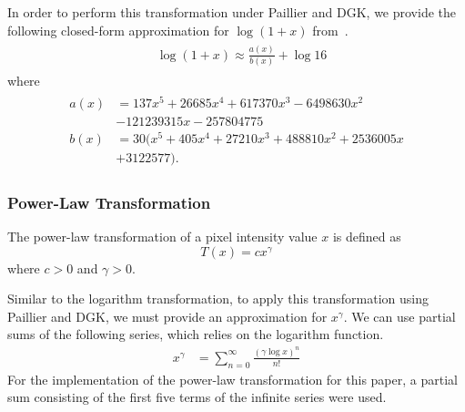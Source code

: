 In order to perform this transformation under Paillier and DGK, we provide the following closed-form approximation for $\log\left(1 + x\right)$ from~\cite{pcsc-paper}.
\begin{align}\label{eq:optimal_log_approximation}
	\begin{split}
		&\log\left(1+x\right) \approx \frac{a(x)}{b(x)} + \log{16}
	\end{split}
\end{align}
where
\begin{align*}
	\begin{split}
	a(x) &= 137x^5 + 26685x^4 + 617370x^3 - 6498630x^2 \\
	&- 121239315x - 257804775\\
	b(x) &= 30(x^5 + 405x^4 + 27210x^3 + 488810x^2 + 2536005x \\
	&+ 3122577).
	\end{split}
\end{align*}

\subsubsection{Power-Law Transformation}
The power-law transformation of a pixel intensity value $x$ is defined as
\begin{equation}
    T\left(x\right) = cx^{\gamma}
\end{equation}
where $c>0$ and $\gamma > 0$.

Similar to the logarithm transformation, to apply this transformation using Paillier and DGK, we must provide an approximation for $x^\gamma$.
We can use partial sums of the following series, which relies on the logarithm function.
\begin{align}
	x^\gamma &= \sum_{n=0}^{\infty}{\frac{(\gamma\log{x})^n}{n!}}
\end{align}
For the implementation of the power-law transformation for this paper, a partial sum consisting of the first five terms of the infinite series were used.

